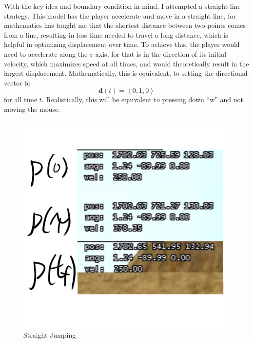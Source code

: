 \documentclass[a4paper,12pt]{article}
\newcommand{\tvec}[1]{\boldsymbol{#1}}
\newcommand{\tang}[1]{\left\langle #1 \right\rangle}
\newcommand{\td}{\tvec{d}}
\begin{document}
With the key idea and boundary condition in mind, I attempted a straight line strategy. This model has the player accelerate and move in a straight line, for mathematics has taught me that the shortest distance between two points comes from a line, resulting in less time needed to travel a long distance, which is helpful in optimizing displacement over time. To achieve this, the player would need to accelerate along the y-axis, for that is in the direction of its initial velocity, which maximizes speed at all times, and would theoretically result in the largest displacement. Mathematically, this is equivalent, to setting the directional vector to
\[
    \td(t) = \tang{0, 1, 0}
\]
for all time $t$. Realistically, this will be equivalent to pressing down ``w'' and not moving the mouse.
\begin{figure}[H]
    \centering
    \begin{minipage}{.5\textwidth}
        \centering
        \includegraphics[width=0.9\linewidth]{assets/2straightjumping.png}
        \caption{Straight Jumping}
        \label{fig:2straightjumping}
    \end{minipage}%
    \begin{minipage}{.5\textwidth}
        \centering

\end{minipage}
\end{figure}
\end{document}
